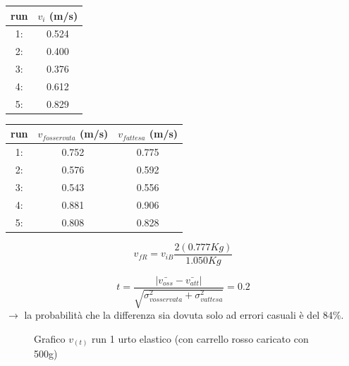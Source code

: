 \documentclass[a4paper]{article}
\theoremstyle{definition}
\begin{document}
\begin{minipage}[c]{0.5\textwidth}
	\captionsetup{labelformat=empty}
	\centering
	\begin{tabular}{||cc||}
		\hline
		\hline
		run &  \(v_{i}\) (m/s)\\
		\hline
		1: & 0.524   \\ 
		2: & 0.400\\
		3: & 0.376\\
		4: & 0.612\\
		5: & 0.829\\
		\hline
		\hline
	\end{tabular}
	
\end{minipage}
\begin{minipage}[c]{0.5\textwidth}
	\captionsetup{labelformat=empty}
	\centering
	\begin{tabular}{||ccc||}
		\hline
		\hline
		run &  \(v_{fosservata}\) (m/s) & \(v_{fattesa}\) (m/s)\\
		\hline
		1: & 0.752 & 0.775 \\
		2: &0.576& 0.592\\
		3: &0.543& 0.556\\
		4: & 0.881& 0.906\\
		5: &0.808& 0.828\\
		\hline
		\hline
	\end{tabular}
\end{minipage}

\[v_{f R} = v_{i B} \frac{2 (0.777 Kg)}{1.050 Kg}\]

\[t = \frac{ \left |\bar{v_{oss}}  - \bar{v_{att}} \right |}{\sqrt{\sigma_{vosservata}^{2}+ \sigma_{vattesa}^{2}}} = 0.2 \]
\noindent \(\rightarrow\) la probabilità che la differenza sia dovuta solo ad errori casuali è del 84\(\%\).
\begin{figure}[!ht]
	\captionsetup{labelformat=empty}
	\caption{Grafico \(v_{(t)}\) run 1 urto elastico (con carrello rosso caricato con 500g)}
	
\end{figure}
\end{document}

